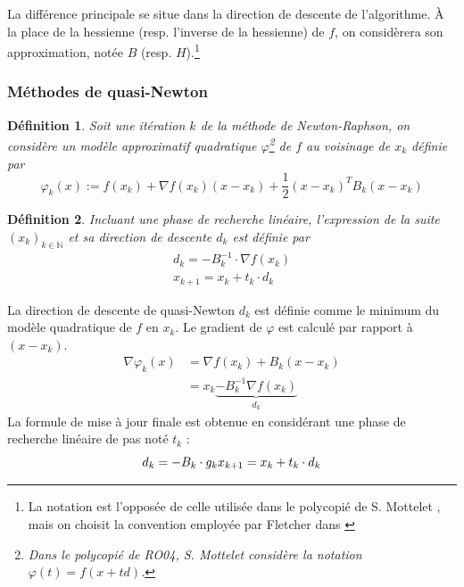 \documentclass[3p, twocolumn]{elsarticle}
\newtheorem{definition}{Définition}[section]
\begin{document}
La différence principale se situe dans la direction de descente de l'algorithme. \`A la place de la hessienne (resp. l'inverse de la hessienne) de $f$, on considèrera son approximation, notée $B$ (resp. $H$).\footnote{La notation est l'opposée de celle utilisée dans le polycopié de S. Mottelet \cite{poly:mottelet2003}, mais on choisit la convention employée par Fletcher dans \cite{book:Fletcher_1987}}

\subsubsection{Méthodes de quasi-Newton}
\begin{definition}
    Soit une itération $k$ de la méthode de Newton-Raphson, on considère un modèle approximatif quadratique $\varphi$\footnote{Dans le polycopié de RO04, S. Mottelet \cite{poly:mottelet2003} considère la notation $\varphi(t) = f(x+td)$.} de $f$ au voisinage de $x_{k}$ définie par
    \begin{equation}
        \varphi_k(x) := f(x_k) + \nabla f(x_k) (x - x_k) + \frac12 (x-x_k)^T B_k (x-x_k)
    \end{equation}
\end{definition}

\begin{definition}
    Incluant une phase de recherche linéaire, l'expression de la suite $(x_k)_{k\in \mathbb{N}}$ et sa direction de descente $d_k$ est définie par 
    \begin{align}
        d_k = -B_k^{-1}\cdot \nabla f(x_k)\nonumber \\
        x_{k+1} = x_k + t_k\cdot d_k
        \label{eq:suite-qn}
    \end{align}
\end{definition}

\begin{pf}
    La direction de descente de quasi-Newton $d_k$ est définie comme le minimum du modèle quadratique de $f$ en $x_k$. Le gradient de $\varphi$ est calculé par rapport à $(x - x_k)$. 
    \begin{align*}
        \nabla \varphi_k(x)&=\nabla f(x_k) + B_k(x-x_k)\\
        &= x_k \underbrace{- B_k^{-1}\nabla f(x_k)}_{d_k} 
    \end{align*}
    La formule de mise à jour finale est obtenue en considérant une phase de recherche linéaire de pas noté $t_k$ :
    \begin{equation}
        d_k = -B_k\cdot g_k \\
        x_{k+1} = x_k + t_k\cdot d_k
    \end{equation}
\end{pf}
\end{document}
